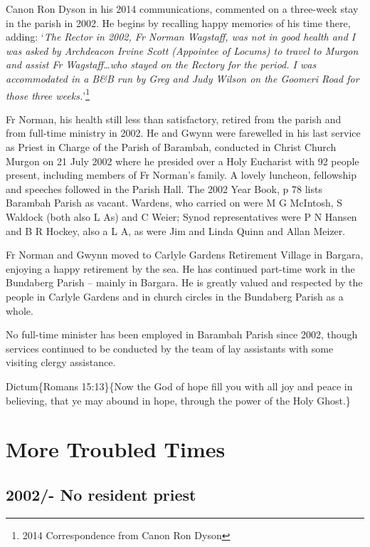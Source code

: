 Canon Ron Dyson in his 2014 communications, commented on a three-week stay in the parish in 2002. He begins by recalling happy memories of his time there, adding: `\emph{The Rector in 2002, Fr Norman Wagstaff, was not in good health and I was asked by Archdeacon Irvine Scott (Appointee of Locums) to travel to Murgon and assist Fr Wagstaff\ldots who stayed on the Rectory for the period. I was accommodated in a B\&B run by Greg and Judy Wilson on the Goomeri Road for those three weeks.}'\footnote{2014 Correspondence from Canon Ron Dyson}

Fr Norman, his health still less than satisfactory, retired from the parish and from full-time ministry in 2002. He and Gwynn were farewelled in his last service as Priest in Charge of the Parish of Barambah, conducted in Christ Church Murgon on 21 July 2002 where he presided over a Holy Eucharist with 92 people present, including members of Fr Norman's family. A lovely luncheon, fellowship and speeches followed in the Parish Hall. The 2002 Year Book, p 78 lists Barambah Parish as vacant. Wardens, who carried on were M G McIntosh, S Waldock (both also L As) and C Weier; Synod representatives were P N Hansen and B R Hockey, also a L A, as were Jim and Linda Quinn and Allan Meizer.

Fr Norman and Gwynn moved to Carlyle Gardens Retirement Village in Bargara, enjoying a happy retirement by the sea. He has continued part-time work in the Bundaberg Parish -- mainly in Bargara. He is greatly valued and respected by the people in Carlyle Gardens and in church circles in the Bundaberg Parish as a whole.

No full-time minister has been employed in Barambah Parish since 2002, though services continued to be conducted by the team of lay assistants with some visiting clergy assistance.

Dictum\{Romans 15:13\}\{Now the God of hope fill you with all joy and peace in believing, that ye may abound in hope, through the power of the Holy Ghost.\}

\hypertarget{more-troubled-times}{%
\chapter{More Troubled Times}\label{more-troubled-times}}

\hypertarget{no-resident-priest}{%
\section{2002/- No resident priest}\label{no-resident-priest}}


